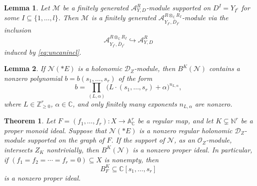 \documentclass[10pt,a4paper]{amsart}
\newtheorem{lemma}{Lemma}
\newtheorem{theorem}{Theorem}
\newcommand{\A}{\mathbb{A}}
\newcommand{\C}{\mathbb{C}} %
\newcommand{\N}{\mathbb{N}}
\newcommand{\Z}{\mathbb{Z}}
\newcommand{\cM}{\mathcal{M}}
\newcommand{\cN}{\mathcal{N}}
\newcommand{\cO}{\mathscr{O}}
\newcommand{\sA}{\mathscr{A}}
\newcommand{\shD}{\mathscr{D}}
\begin{document}
\begin{lemma}\label{lm:logKashequiv}
Let $\cM$ be a finitely generated $\sA^R_{Y,D}$-module supported on
$D^I=Y_{I^c}$
for some $I\subseteq \{1,\dots,l\}$. Then $\cM$ is a finitely generated
$\sA_{Y_{I^c},\bar D_{I^c}}^{R\otimes_\C R_I}$-module via the inclusion
\[
\sA_{Y_{I^c},\bar D_{I^c}}^{R\otimes_\C R_I}
\hookrightarrow
\sA^R_{Y,D}
\]
induced by \eqref{eq:uncanincl}.
\end{lemma}

\begin{lemma}\label{lm:subbahgb}
If $\cN(*E)$ is a holonomic $\shD_Z$-module, then $B^K(\cN)$ contains a
nonzero polynomial $b=b(s_1,\dots,s_r)$ of the form
\[
b
=
\prod_{(L,\alpha)}
\big(L\cdot(s_1,\dots,s_r)+\alpha\big)^{n_{L,\alpha}},
\]
where $L\in \Z_{\ge 0}^r$, $\alpha\in \C$, and only finitely many exponents
$n_{L,\alpha}$ are nonzero.
\end{lemma}

\begin{theorem}\label{thm:nozeroproperBSI}
Let
$F=(f_1,\dots,f_r)\colon X\to \A_\C^r$
be a regular map, and let $K\subsetneq \N^r$ be a proper monoid ideal. Suppose
that $\cN(*E)$ is a nonzero regular holonomic $\shD_Z$-module supported on the
graph of $F$. If the support of $\cN$, as an $\cO_Z$-module, intersects
$Z_K$ nontrivially, then $B^K(\cN)$ is a nonzero proper ideal. In particular,
if
$(f_1=f_2=\cdots=f_r=0)\subseteq X$
is nonempty, then
\[
B_F^K\subseteq \C[s_1,\dots,s_r]
\]
is a nonzero proper ideal.
\end{theorem}
\end{document}
